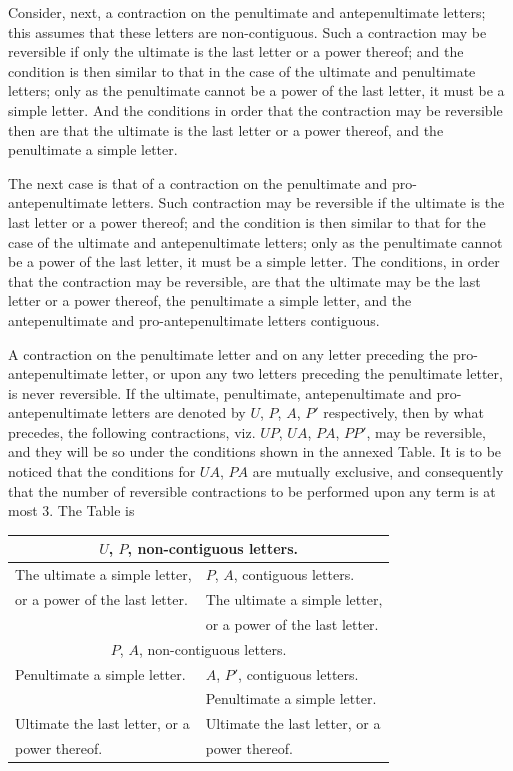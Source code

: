 \documentclass[11pt,a4paper]{article}
\theoremstyle{definition}
\begin{document}
Consider, next, a contraction on the penultimate and antepenultimate letters; this assumes that these letters are non-contiguous. Such a contraction may be reversible if only the ultimate is the last letter or a power thereof; and the condition is then similar to that in the case of the ultimate and penultimate letters; only as the penultimate cannot be a power of the last letter, it must be a simple letter. And the conditions in order that the contraction may be reversible then are that the ultimate is the last letter or a power thereof, and the penultimate a simple letter.

The next case is that of a contraction on the penultimate and pro-antepenultimate letters. Such contraction may be reversible if the ultimate is the last letter or a power thereof; and the condition is then similar to that for the case of the ultimate and antepenultimate letters; only as the penultimate cannot be a power of the last letter, it must be a simple letter. The conditions, in order that the contraction may be reversible, are that the ultimate may be the last letter or a power thereof, the penultimate a simple letter, and the antepenultimate and pro-antepenultimate letters contiguous.

A contraction on the penultimate letter and on any letter preceding the pro-antepenultimate letter, or upon any two letters preceding the penultimate letter, is never reversible. If the ultimate, penultimate, antepenultimate and pro-antepenultimate letters are denoted by $U$, $P$, $A$, $P'$ respectively, then by what precedes, the following contractions, viz. $UP$, $UA$, $PA$, $PP'$, may be reversible, and they will be so under the conditions shown in the annexed Table. It is to be noticed that the conditions for $UA$, $PA$ are mutually exclusive, and consequently that the number of reversible contractions to be performed upon any term is at most 3. The Table is

\begin{center}
\begin{tabular}{|l|l|}
\hline
\multicolumn{2}{|c|}{$U$, $P$, non-contiguous letters.} \\
\hline
The ultimate a simple letter, & $P$, $A$, contiguous letters. \\
or a power of the last letter. & The ultimate a simple letter, \\
& or a power of the last letter. \\
\hline
\multicolumn{2}{|c|}{$P$, $A$, non-contiguous letters.} \\
\hline
Penultimate a simple letter. & $A$, $P'$, contiguous letters. \\
& Penultimate a simple letter. \\
Ultimate the last letter, or a & Ultimate the last letter, or a \\
power thereof. & power thereof. \\
\hline
\end{tabular}
\end{center}
\end{document}
